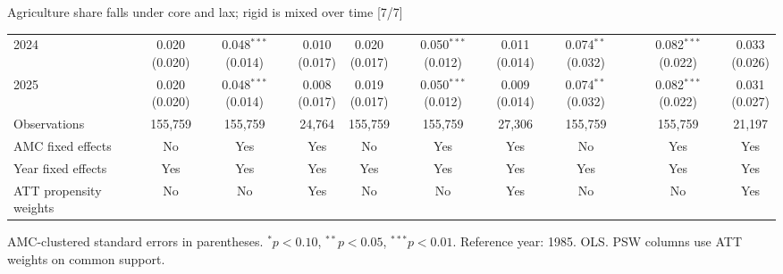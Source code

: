 \documentclass[aspectratio=169]{beamer}
\begin{document}
\begin{frame}{Agriculture share falls under core and lax; rigid is mixed over time [7/7]}
{\begin{tabular}{@{}l*{9}{c}@{}}
2024 & \shortstack{0.020\\(0.020)} & \shortstack{0.048$^{***}$\\(0.014)} & \shortstack{0.010\\(0.017)} & \shortstack{0.020\\(0.017)} & \shortstack{0.050$^{***}$\\(0.012)} & \shortstack{0.011\\(0.014)} & \shortstack{0.074$^{**}$\\(0.032)} & \shortstack{0.082$^{***}$\\(0.022)} & \shortstack{0.033\\(0.026)} \\
2025 & \shortstack{0.020\\(0.020)} & \shortstack{0.048$^{***}$\\(0.014)} & \shortstack{0.008\\(0.017)} & \shortstack{0.019\\(0.017)} & \shortstack{0.050$^{***}$\\(0.012)} & \shortstack{0.009\\(0.014)} & \shortstack{0.074$^{**}$\\(0.032)} & \shortstack{0.082$^{***}$\\(0.022)} & \shortstack{0.031\\(0.027)} \\
\midrule
Observations & 155,759 & 155,759 & 24,764 & 155,759 & 155,759 & 27,306 & 155,759 & 155,759 & 21,197 \\
AMC fixed effects & No & Yes & Yes & No & Yes & Yes & No & Yes & Yes \\
Year fixed effects & Yes & Yes & Yes & Yes & Yes & Yes & Yes & Yes & Yes \\
ATT propensity weights & No & No & Yes & No & No & Yes & No & No & Yes \\
\bottomrule
\end{tabular}%
}
\vspace{0.1em}
{\tiny\color{ZMidGray} AMC-clustered standard errors in parentheses. $^{*}p<0.10$, $^{**}p<0.05$, $^{***}p<0.01$. Reference year: 1985. OLS. PSW columns use ATT weights on common support.}
\end{frame}
\end{document}

